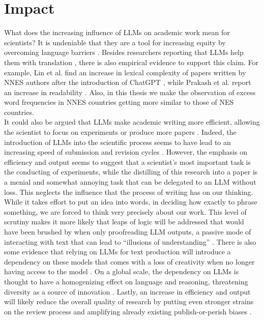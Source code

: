 \section{Impact}
What does the increasing influence of LLMs on academic work mean for scientists?
It is undeniable that they are a tool for increasing equity by overcoming language barriers \cite{Berdejo-Espinola2023}.
Besides researchers reporting that LLMs help them with translation \cite{Kwon2025, Mohammadi2026,Wiley2025}, there is also empirical evidence to support this claim.
For example, Lin et al. find an increase in lexical complexity of papers written by NNES authors after the introduction of ChatGPT \cite{Lin2025_NES}, while Prakash et al. report an increase in readability \cite{Prakash2025}.
Also, in this thesis we make the observation of excess word frequencies in NNES countries getting more similar to those of NES countries.
\\
It could also be argued that LLMs make academic writing more efficient, allowing the scientist to focus on experiments or produce more papers \cite{Filimonovic2025}.
Indeed, the introduction of LLMs into the scientific process seems to have lead to an increasing speed of submission and revision cycles \cite{Qi2025}. 
However, the emphasis on efficiency and output seems to suggest that a scientist's most important task is the conducting of experiments, while the distilling of this research into a paper is a menial and somewhat annoying task that can be delegated to an LLM without loss. %
This neglects the influence that the process of writing has on our thinking. %
While it takes effort to put an idea into words, in deciding how exactly to phrase something, we are forced to think very precisely about our work.
This level of scrutiny makes it more likely that leaps of logic will be addressed that would have been brushed by when only proofreading LLM outputs, a passive mode of interacting with text that can lead to ``illusions of understanding'' \cite{messeri2024artificial,Tang2025}.
There is also some evidence that relying on LLMs for text production will introduce a dependency on these models that comes with a loss of creativity when no longer having access to the model \cite{Zhou2026_creative}.
On a global scale, the dependency on LLMs is thought to have a homogenizing effect on language and reasoning, threatening diversity as a source of innovation \cite{Sourati2026,Zhou2026_creative}.
Lastly, an increase in efficiency and output will likely reduce the overall quality of research by putting even stronger strains on the review process \cite{Gray2026} and amplifying already existing publish-or-perish biases \cite{Kendall2024}.
